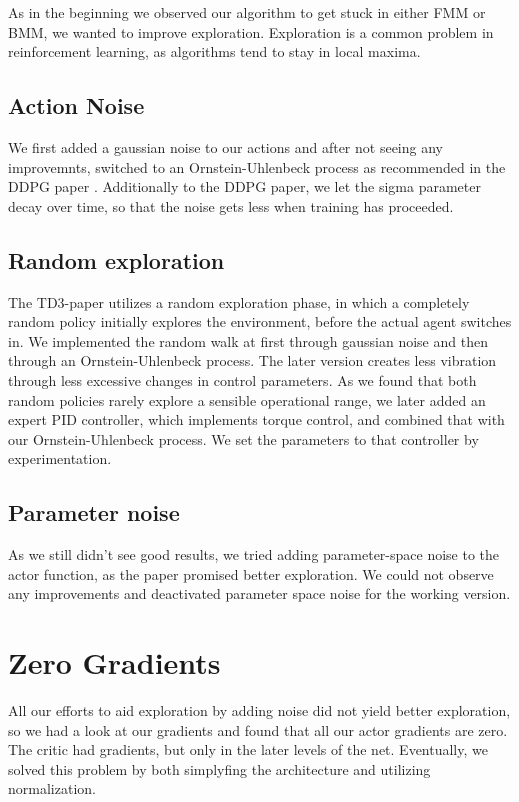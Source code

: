 \documentclass[hyperref,german,beleg]{cgvpub}
\begin{document}
As in the beginning we observed our algorithm to get stuck in either \ac{FMM} or \ac{BMM}, we wanted to improve exploration. Exploration is a common problem in reinforcement learning, as algorithms tend to stay in local maxima. 

\subsection{Action Noise}

We first added a gaussian noise to our actions and after not seeing any improvemnts, switched to an Ornstein-Uhlenbeck process \cite{uhlenbeckTheoryBrownianMotion1930} as recommended in the DDPG paper \cite[formula (7)]{lillicrapCONTINUOUSCONTROLDEEP2015}. Additionally to the DDPG paper, we let the sigma parameter decay over time, so that the noise gets less when training has proceeded.

\subsection{Random exploration}

The TD3-paper \cite{fujimotoAddressingFunctionApproximation2018} utilizes a random exploration phase, in which a completely random policy \cite{mozerDiscoveringStructureReactive1990} initially explores the environment, before the actual agent switches in. We implemented the random walk at first through gaussian noise and then through an Ornstein-Uhlenbeck process. The later version creates less vibration through less excessive changes in control parameters. As we found that both random policies rarely explore a sensible operational range, we later added an expert PID controller, which implements torque control, and combined that with our Ornstein-Uhlenbeck process. We set the parameters to that controller by experimentation.

\subsection{Parameter noise}

As we still didn't see good results, we tried adding parameter-space noise \cite{plappertParameterSpaceNoise2017} to the actor function, as the paper promised better exploration. We could not observe any improvements and deactivated parameter space noise for the working version.

\section{Zero Gradients}
All our efforts to aid exploration by adding noise did not yield better exploration, so we had a look at our gradients and found that all our actor gradients are zero. The critic had gradients, but only in the later levels of the net. Eventually, we solved this problem by both simplyfing the architecture and utilizing normalization.
\end{document}
